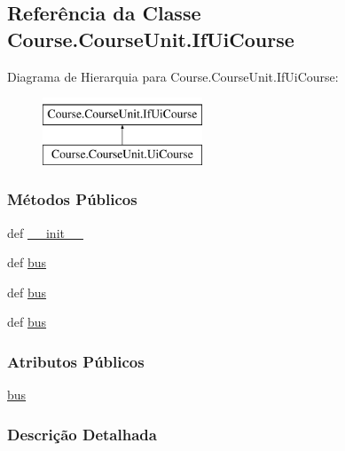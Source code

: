 \hypertarget{classCourse_1_1CourseUnit_1_1IfUiCourse}{\subsection{Referência da Classe Course.\-Course\-Unit.\-If\-Ui\-Course}
\label{classCourse_1_1CourseUnit_1_1IfUiCourse}
}
Diagrama de Hierarquia para Course.\-Course\-Unit.\-If\-Ui\-Course\-:\begin{figure}[H]
\begin{center}
\leavevmode
\includegraphics[height=2.000000cm]{d6/d82/classCourse_1_1CourseUnit_1_1IfUiCourse}
\end{center}
\end{figure}
\subsubsection*{Métodos Públicos}
\begin{DoxyCompactItemize}
\item 
def \hyperlink{classCourse_1_1CourseUnit_1_1IfUiCourse_a2520bf9924cf4f583820ad9fac468fe2}{\-\_\-\-\_\-init\-\_\-\-\_\-}
\item 
def \hyperlink{classCourse_1_1CourseUnit_1_1IfUiCourse_a6d3c42a9777fe9dd395d9390aef47903}{bus}
\item 
def \hyperlink{classCourse_1_1CourseUnit_1_1IfUiCourse_a6d3c42a9777fe9dd395d9390aef47903}{bus}
\item 
def \hyperlink{classCourse_1_1CourseUnit_1_1IfUiCourse_a6d3c42a9777fe9dd395d9390aef47903}{bus}
\end{DoxyCompactItemize}
\subsubsection*{Atributos Públicos}
\begin{DoxyCompactItemize}
\item 
\hyperlink{classCourse_1_1CourseUnit_1_1IfUiCourse_a228fc709b99da3a7e6f5020bd07cee03}{bus}
\end{DoxyCompactItemize}


\subsubsection{Descrição Detalhada}


